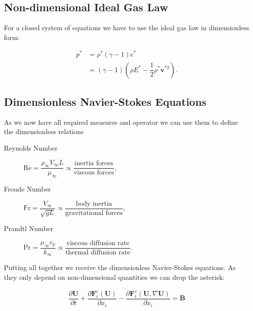 		
	\subsection{Non-dimensional Ideal Gas Law}
	For a closed system of equations we have to use the ideal gas law in dimensionless form: 
	
	\begin{align}
		p^* &= \rho^* (\gamma - 1) e^* \\
		&= (\gamma - 1) \left(\rho E^* - \dfrac{1}{2} \rho^* \mathbf{v}^{*2}\right) .
	\end{align}	
	
	\subsection{Dimensionless Navier-Stokes Equations}
	As we now have all required measures and operator we can use them to define the dimensionless relations 
	\begin{description}
		\item[Reynolds Number] $\text{Re} = \dfrac{\rho_\infty V_\infty L}{\mu_\infty} \propto \dfrac{\text{inertia forces}}{\text{viscous forces}}$,
		\item[Froude Number] \quad $\text{Fr} = \dfrac{V_\infty }{\sqrt{g L}} \propto \dfrac{\text{body inertia}}{\text{gravitational forces}}$,
		\item[Prandtl Number]\quad $\text{Pr} = \dfrac{ \mu_\infty c_p}{k_\infty} \propto \dfrac{\text{viscous diffusion rate}}{\text{thermal diffusion rate}}$.
	\end{description}
	Putting all together we receive the dimensionless Navier-Stokes equations. As they only depend on non-dimensional quantities we can drop the asterisk:
	
	\begin{align}
		\dfrac{\partial \mathbf{U}}{\partial t} + \dfrac{\partial \mathbf{F}_i^c(\mathbf{U})}{\partial x_i} - \dfrac{\partial \mathbf{F}_i^v(\mathbf{U}, \nabla\mathbf{U})}{\partial x_i} = \mathbf{B}
	\end{align}
	
